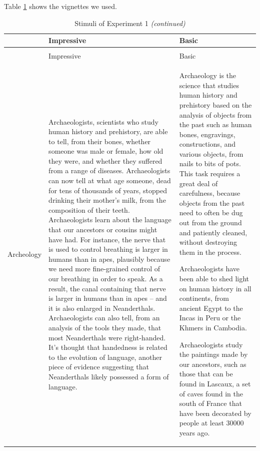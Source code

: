 \documentclass[
  doc,floatsintext]{apa6}
\begin{document}
Table \ref{tab:exp1-stimuli} shows the vignettes we used.

\begingroup\fontsize{8}{10}\selectfont

\begin{longtable}[t]{>{\raggedright\arraybackslash}p{5em}>{\raggedright\arraybackslash}p{25em}>{\raggedright\arraybackslash}p{25em}}
\caption{\label{tab:exp1-stimuli}Stimuli of Experiment 1}\\
\toprule
 & Impressive & Basic\\
\midrule
\endfirsthead
\caption[]{\label{tab:exp1-stimuli}Stimuli of Experiment 1 \textit{(continued)}}\\
\toprule
 & Impressive & Basic\\
\midrule
\endhead

\endfoot
\bottomrule
\endlastfoot
Archeology & Archaeologists, scientists who study human history and prehistory, are able to tell, from their bones, whether someone was male or female, how old they were, and whether they suffered from a range of diseases. Archaeologists can now tell at what age someone, dead for tens of thousands of years, stopped drinking their mother’s milk, from the composition of their teeth.
Archaeologists learn about the language that our ancestors or cousins might have had. For instance, the nerve that is used to control breathing is larger in humans than in apes, plausibly because we need more fine-grained control of our breathing in order to speak. As a result, the canal containing that nerve is larger in humans than in apes – and it is also enlarged in Neanderthals.
Archaeologists can also tell, from an analysis of the tools they made, that most Neanderthals were right-handed. It’s thought that handedness is related to the evolution of language, another piece of evidence suggesting that Neanderthals likely possessed a form of language. & Archaeology is the science that studies human history and prehistory based on the analysis of objects from the past such as human bones, engravings, constructions, and various objects, from nails to bits of pots. This task requires a great deal of carefulness, because objects from the past need to often be dug out from the ground and patiently cleaned, without destroying them in the process.

Archaeologists have been able to shed light on human history in all continents, from ancient Egypt to the Incas in Peru or the Khmers in Cambodia.

Archaeologists study the paintings made by our ancestors, such as those that can be found in Lascaux, a set of caves found in the south of France that have been decorated by people at least 30000 years ago.


\end{longtable}
\end{document}
